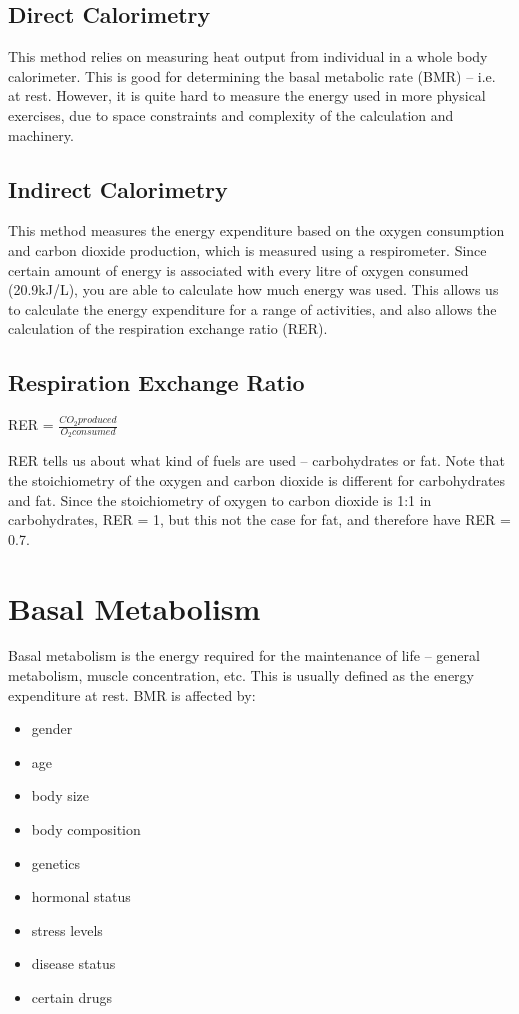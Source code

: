 \documentclass[a4paper, 12pt]{report}
\begin{document}
\subsection{Direct Calorimetry}

This method relies on measuring heat output from individual in a whole body calorimeter.
This is good for determining the basal metabolic rate (BMR) -- i.e. at rest.
However, it is quite hard to measure the energy used in more physical exercises, due to space constraints and complexity of the calculation and machinery.

\subsection{Indirect Calorimetry}

This method measures the energy expenditure based on the oxygen consumption and carbon dioxide production, which is measured using a respirometer.
Since certain amount of energy is associated with every litre of oxygen consumed (20.9kJ/L), you are able to calculate how much energy was used.
This allows us to calculate the energy expenditure for a range of activities, and also allows the calculation of the respiration exchange ratio (RER).

\subsection{Respiration Exchange Ratio}

\begin{center}
\large{RER = $\frac{CO_2 produced}{O_2 consumed}$}
\end{center}

RER tells us about what kind of fuels are used -- carbohydrates or fat.
Note that the stoichiometry of the oxygen and carbon dioxide is different for carbohydrates and fat.
Since the stoichiometry of oxygen to carbon dioxide is 1:1 in carbohydrates, RER = 1, but this not the case for fat, and therefore have RER = 0.7.

\section{Basal Metabolism}

Basal metabolism is the energy required for the maintenance of life -- general metabolism, muscle concentration, etc.
This is usually defined as the energy expenditure at rest.
BMR is affected by:
\begin{itemize}
\item gender
\item age 
\item body size
\item body composition
\item genetics
\item hormonal status
\item stress levels
\item disease status
\item certain drugs
\end{itemize}
\end{document}
